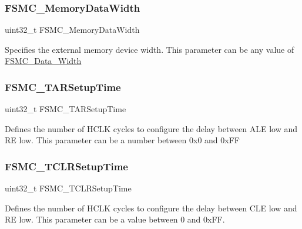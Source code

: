 \subsubsection{\texorpdfstring{FSMC\_MemoryDataWidth}{FSMC\_MemoryDataWidth}}
{\footnotesize\ttfamily uint32\+\_\+t F\+S\+M\+C\+\_\+\+Memory\+Data\+Width}

Specifies the external memory device width. This parameter can be any value of \mbox{\hyperlink{group___f_s_m_c___data___width}{F\+S\+M\+C\+\_\+\+Data\+\_\+\+Width}} \mbox{\label{struct_f_s_m_c___n_a_n_d_init_type_def_ab1fc3b07b6286b4974690191231f2773}} 
\subsubsection{\texorpdfstring{FSMC\_TARSetupTime}{FSMC\_TARSetupTime}}
{\footnotesize\ttfamily uint32\+\_\+t F\+S\+M\+C\+\_\+\+T\+A\+R\+Setup\+Time}

Defines the number of H\+C\+LK cycles to configure the delay between A\+LE low and RE low. This parameter can be a number between 0x0 and 0x\+FF \mbox{\label{struct_f_s_m_c___n_a_n_d_init_type_def_ab9fd4e9d4db1fc098d5f4ccffb80bf61}} 
\subsubsection{\texorpdfstring{FSMC\_TCLRSetupTime}{FSMC\_TCLRSetupTime}}
{\footnotesize\ttfamily uint32\+\_\+t F\+S\+M\+C\+\_\+\+T\+C\+L\+R\+Setup\+Time}

Defines the number of H\+C\+LK cycles to configure the delay between C\+LE low and RE low. This parameter can be a value between 0 and 0x\+FF. \mbox{\label{struct_f_s_m_c___n_a_n_d_init_type_def_a9ecc2cc3ec6462a8a86e545c9b8ff3cf}} 
